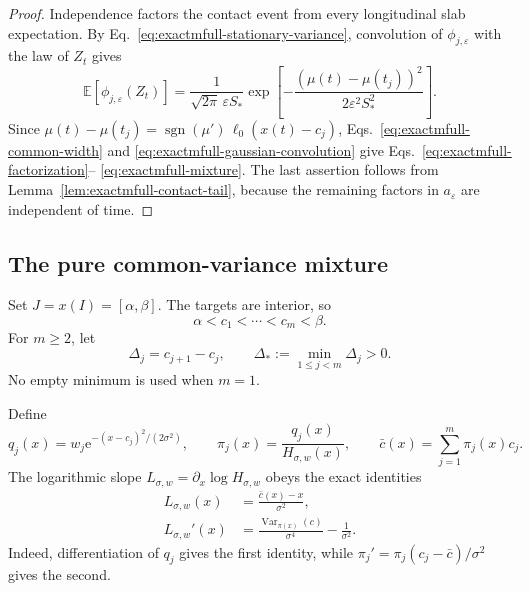 \documentclass[aps,physrev,onecolumn,amsmath,amssymb,longbibliography]{revtex4-2}
\newcommand{\e}{\mathrm e}
\begin{document}
\begin{proof}
Independence factors the contact event from every longitudinal slab
expectation.  By Eq.~\eqref{eq:exactmfull-stationary-variance}, convolution
of \(\phi_{j,\varepsilon}\) with the law of \(Z_t\) gives
\begin{equation}
 \mathbb E[\phi_{j,\varepsilon}(Z_t)]
 =\frac{1}{\sqrt{2\pi}\,\varepsilon S_*}
 \exp\!\left[-\frac{(\mu(t)-\mu(t_j))^2}
 {2\varepsilon^2S_*^2}\right].
 \label{eq:exactmfull-gaussian-convolution}
\end{equation}
Since
\(\mu(t)-\mu(t_j)=\operatorname{sgn}(\mu')\,\ell_0(x(t)-c_j)\),
Eqs.~\eqref{eq:exactmfull-common-width} and
\eqref{eq:exactmfull-gaussian-convolution} give
Eqs.~\eqref{eq:exactmfull-factorization}--%
\eqref{eq:exactmfull-mixture}.  The last assertion follows from
Lemma~\ref{lem:exactmfull-contact-tail}, because the remaining factors in
\(a_\varepsilon\) are independent of time.
\end{proof}

\subsection{The pure common-variance mixture}
\label{subsec:exactmfull-pure-mixture}

Set \(J=x(I)=[\alpha,\beta]\).  The targets are interior, so
\begin{equation}
 \alpha<c_1<\cdots<c_m<\beta.
 \label{eq:exactmfull-centre-order}
\end{equation}
For \(m\ge2\), let
\begin{equation}
 \Delta_j=c_{j+1}-c_j,
 \qquad \Delta_*:=\min_{1\le j<m}\Delta_j>0.
 \label{eq:exactmfull-gaps}
\end{equation}
No empty minimum is used when \(m=1\).

Define
\begin{equation}
 q_j(x)=w_j\e^{-(x-c_j)^2/(2\sigma^2)},
 \qquad
 \pi_j(x)=\frac{q_j(x)}{H_{\sigma,w}(x)},
 \qquad
 \bar c(x)=\sum_{j=1}^m\pi_j(x)c_j.
 \label{eq:exactmfull-posterior}
\end{equation}
The logarithmic slope \(L_{\sigma,w}=\partial_x\log H_{\sigma,w}\) obeys
the exact identities
\begin{align}
 L_{\sigma,w}(x)
 &=\frac{\bar c(x)-x}{\sigma^2},
 \label{eq:exactmfull-log-slope}\\
 L_{\sigma,w}'(x)
 &=\frac{\operatorname{Var}_{\pi(x)}(c)}{\sigma^4}
   -\frac{1}{\sigma^2}.
 \label{eq:exactmfull-log-slope-derivative}
\end{align}
Indeed, differentiation of \(q_j\) gives the first identity, while
\(\pi_j'=\pi_j(c_j-\bar c)/\sigma^2\) gives the second.
\end{document}
